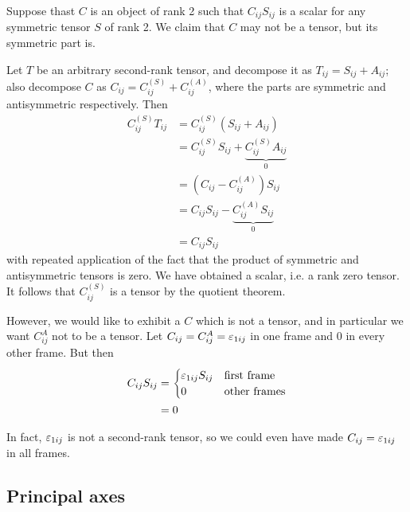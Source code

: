\documentclass{../template/note}
\begin{document}
    
    \begin{example*}[hard]
        Suppose thast \(C\) is an object of rank 2 such that \(C_{ij}S_{ij}\) is a scalar for any symmetric tensor \(S\) of rank 2. We claim that \(C\) may not be a tensor, but its symmetric part is.

        Let \(T\) be an arbitrary second-rank tensor, and decompose it as \(T_{ij} = S_{ij} + A_{ij}\); also decompose \(C\) as \(C_{ij} = C^{(S)}_{ij} + C^{(A)}_{ij}\), where the parts are symmetric and antisymmetric respectively. Then
        \begin{align*}
            C^{(S)}_{ij}T_{ij} &= C^{(S)}_{ij}(S_{ij}+A_{ij}) \\
            &= C^{(S)}_{ij}S_{ij} + \underbrace{C^{(S)}_{ij}A_{ij}}_0 \\
            &= \left(C_{ij} - C^{(A)}_{ij}\right)S_{ij} \\
            &= C_{ij}S_{ij} - \underbrace{C^{(A)}_{ij}S_{ij}}_0 \\
            &= C_{ij}S_{ij}
        \end{align*}
        with repeated application of the fact that the product of symmetric and antisymmetric tensors is zero. We have obtained a scalar, i.e. a rank zero tensor. It follows that \(C^{(S)}_{ij}\) is a tensor by the quotient theorem.

        However, we would like to exhibit a \(C\) which is not a tensor, and in particular we want \(C^{A}_{ij}\) not to be a tensor. Let \(C_{ij} = C^{A}_{ij} = \varepsilon_{1ij}\) in one frame and 0 in every other frame. But then
        \begin{align*}
            C_{ij}S_{ij} &= \begin{cases}
                \varepsilon_{1ij}S_{ij} & \text{first frame} \\
                0 & \text{other frames}
            \end{cases} \\
            &= 0
        \end{align*}        
    \end{example*}
    
    \begin{remark*}
        In fact, \(\varepsilon_{1ij}\) is not a second-rank tensor, so we could even have made \(C_{ij} = \varepsilon_{1ij}\) in all frames.
    \end{remark*}
    
    \subsection{Principal axes}
\end{document}
